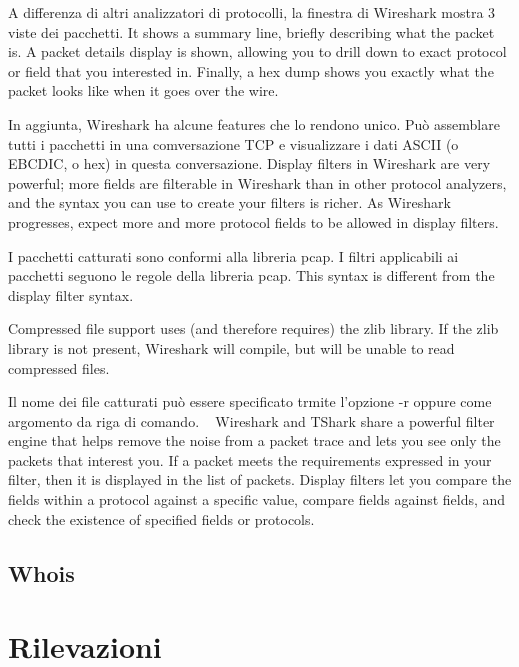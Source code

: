 \documentclass[a4paper,11pt]{book}
\begin{document}
A differenza di altri analizzatori di protocolli, la finestra di Wireshark mostra 3 viste dei pacchetti. It shows a summary line, briefly describing what the packet is. A packet details display is shown, allowing you to drill down to exact protocol or field that you interested in. Finally, a hex dump shows you exactly what the packet looks like when it goes over the wire.

In aggiunta, Wireshark ha alcune features che lo rendono unico. Può assemblare tutti i pacchetti in una comversazione TCP e visualizzare i dati ASCII (o EBCDIC, o hex) in questa conversazione. Display filters in Wireshark are very powerful; more fields are filterable in Wireshark than in other protocol analyzers, and the syntax you can use to create your filters is richer. As Wireshark progresses, expect more and more protocol fields to be allowed in display filters.

I pacchetti catturati sono conformi alla libreria pcap. I filtri applicabili ai pacchetti seguono le regole della libreria pcap. This syntax is different from the display filter syntax.

Compressed file support uses (and therefore requires) the zlib library. If the zlib library is not present, Wireshark will compile, but will be unable to read compressed files.

Il nome dei file catturati può essere specificato trmite l'opzione -r oppure come argomento da riga di comando.
~
Wireshark and TShark share a powerful filter engine that helps remove the noise from a packet trace and lets you see only the packets that interest you. If a packet meets the requirements expressed in your filter, then it is displayed in the list of packets. Display filters let you compare the fields within a protocol against a specific value, compare fields against fields, and check the existence of specified fields or protocols.
\section{Whois}
\chapter{Rilevazioni}
\end{document}
